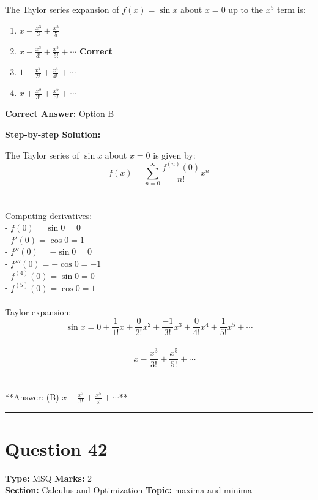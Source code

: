 \documentclass[11pt]{article}
\begin{document}
The Taylor series expansion of \(f(x) = \sin x\) about \(x = 0\) up to the \(x^5\) term is:


\begin{enumerate}[label=\textbf{\Alph*.}, leftmargin=1.8em]
\item \(x - \frac{x^3}{3} + \frac{x^5}{5}\)\item \(x - \frac{x^3}{3!} + \frac{x^5}{5!} + \cdots\) \hfill {\color{gategreen}\textbf{Correct}}\item \(1 - \frac{x^2}{2!} + \frac{x^4}{4!} + \cdots\)\item \(x + \frac{x^3}{3!} + \frac{x^5}{5!} + \cdots\)\end{enumerate}

\textbf{Correct Answer:} Option B

\textbf{Step-by-step Solution:}

The Taylor series of \(\sin x\) about \(x = 0\) is given by:\\
\[f(x) = \sum_{n=0}^{\infty} \frac{f^{(n)}(0)}{n!} x^n\]\\
\\
Computing derivatives:\\
- \(f(0) = \sin 0 = 0\)\\
- \(f'(0) = \cos 0 = 1\)\\
- \(f''(0) = -\sin 0 = 0\)\\
- \(f'''(0) = -\cos 0 = -1\)\\
- \(f^{(4)}(0) = \sin 0 = 0\)\\
- \(f^{(5)}(0) = \cos 0 = 1\)\\
\\
Taylor expansion:\\
\[\sin x = 0 + \frac{1}{1!}x + \frac{0}{2!}x^2 + \frac{-1}{3!}x^3 + \frac{0}{4!}x^4 + \frac{1}{5!}x^5 + \cdots\]\\
\[= x - \frac{x^3}{3!} + \frac{x^5}{5!} + \cdots\]\\
\\
**Answer: (B) \(x - \frac{x^3}{3!} + \frac{x^5}{5!} + \cdots\)**

\vspace{0.8em}
\hrule
\vspace{0.4em}
\section*{Question 42}
\textbf{Type:} MSQ \hfill \textbf{Marks:} 2\\
\textbf{Section:} Calculus and Optimization \hfill \textbf{Topic:} maxima and minima
\end{document}
